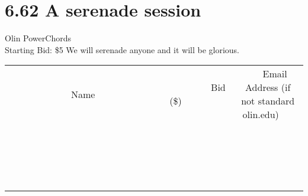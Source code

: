 \documentclass[11pt]{article}
\begin{document}
\section*{6.62 A serenade session}
Olin PowerChords
\\
Starting Bid: \$5
\newline
We will serenade anyone and it will be glorious.
\\[3ex]
\begin{tabular}{c c c}
~~~~~~~~~~~~~Name~~~~~~~~~~~~~ & ~~~~~~~~~Bid (\$)~~~~~~~~~  & ~~~Email Address (if not standard olin.edu)~~~\\
 & & \\
\hline
 & & \\
\hline
 & & \\
\hline
 & & \\
\hline
 & & \\
\hline
 & & \\
\hline
 & & \\
\hline
 & & \\
\hline
 & & \\
\hline
 & & \\
\hline
 & & \\
\hline
 & & \\
\hline
 & & \\
\hline
 & & \\
\hline
 & & \\
\hline
 & & \\
\hline
 & & \\
\hline
 & & \\
\hline
 & & \\
\hline
\end{tabular}
\newpage
\end{document}
